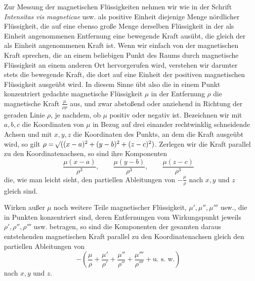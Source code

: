 Zur Messung der magnetischen Flüssigkeiten nehmen wir wie in der Schrift \textit{Intensitas vis magneticae} usw. als positive Einheit diejenige Menge nördlicher Flüssigkeit, die auf eine ebenso große Menge derselben Flüssigkeit in der als Einheit angenommenen Entfernung eine bewegende Kraft ausübt, die gleich der als Einheit angenommenen Kraft ist. Wenn wir einfach von der magnetischen Kraft sprechen, die an einem beliebigen Punkt des Raums durch magnetische Flüssigkeit an einem anderen Ort hervorgerufen wird, verstehen wir darunter stets die bewegende Kraft, die dort auf eine Einheit der positiven magnetischen Flüssigkeit ausgeübt wird. In diesem Sinne übt also die in einem Punkt konzentriert gedachte magnetische Flüssigkeit $\mu$ in der Entfernung $\rho$ die magnetische Kraft $\frac{\mu}{\rho\rho}$ aus, und zwar abstoßend oder anziehend in Richtung der geraden Linie $\rho$, je nachdem, ob $\mu$ positiv oder negativ ist. Bezeichnen wir mit $a,b,c$ die Koordinaten von $\mu$ in Bezug auf drei einander rechtwinklig schneidende Achsen und mit $x,y,z$ die Koordinaten des Punkts, an dem die Kraft ausgeübt wird, so gilt $\rho=\mathord{{}^{}\!\surd}((x-a)^2+(y-b)^2+(z-c)^2)$. Zerlegen wir die Kraft parallel zu den Koordinatenachsen, so sind ihre Komponenten
\[
\frac{\mu(x-a)}{\rho^3},\qquad \frac{\mu(y-b)}{\rho^3},\qquad \frac{\mu(z-c)}{\rho^3}
\]
die, wie man leicht sieht, den partiellen Ableitungen von $-\frac{\mu}{\rho}$ nach $x,y$ und $z$ gleich sind.

Wirken außer $\mu$ noch weitere Teile magnetischer Flüssigkeit, $\mu',\mu'',\mu'''$ usw., die in Punkten konzentriert sind, deren Entfernungen vom Wirkungspunkt jeweils $\rho',\rho'',\rho'''$ usw. betragen, so sind die Komponenten der gesamten daraus entstehenden magnetischen Kraft parallel zu den Koordinatenachsen gleich den partiellen Ableitungen von
\[
-\left(\frac{\mu}{\rho}+\frac{\mu'}{\rho'}+\frac{\mu''}{\rho''}+\frac{\mu'''}{\rho'''}+\text{u. s. w.}\right)
\]
nach $x,y$ und $z$.

